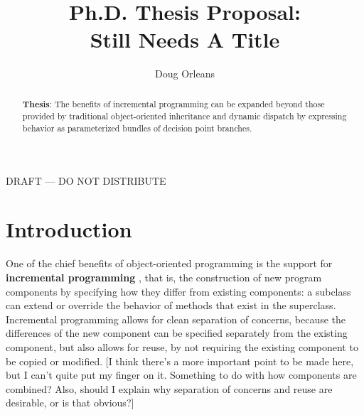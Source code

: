 \documentclass{article}
\title{Ph.D. Thesis Proposal: \\
Still Needs A Title}
\author{Doug Orleans}
\newcommand{\defn}[1]{\textbf{#1}}
\begin{document}

\maketitle


\begin{center}
DRAFT --- DO NOT DISTRIBUTE
\end{center}

\begin{abstract}
\textbf{Thesis}: The benefits of incremental programming can be
expanded beyond those provided by traditional object-oriented
inheritance and dynamic dispatch by expressing behavior as
parameterized bundles of decision point branches.
\end{abstract}

\section{Introduction}

One of the chief benefits of object-oriented programming is the
support for \defn{incremental programming} \cite{mezini-thesis}, that
is, the construction of new program components by specifying how they
differ from existing components: a subclass can extend or override the
behavior of methods that exist in the superclass.  Incremental
programming allows for clean separation of concerns, because the
differences of the new component can be specified separately from the
existing component, but also allows for reuse, by not requiring the
existing component to be copied or modified.
[I think there's a more important point to be made here, but I
can't quite put my finger on it.  Something to do with how components
are combined?  Also, should I explain why separation of concerns and
reuse are desirable, or is that obvious?]
\end{document}
